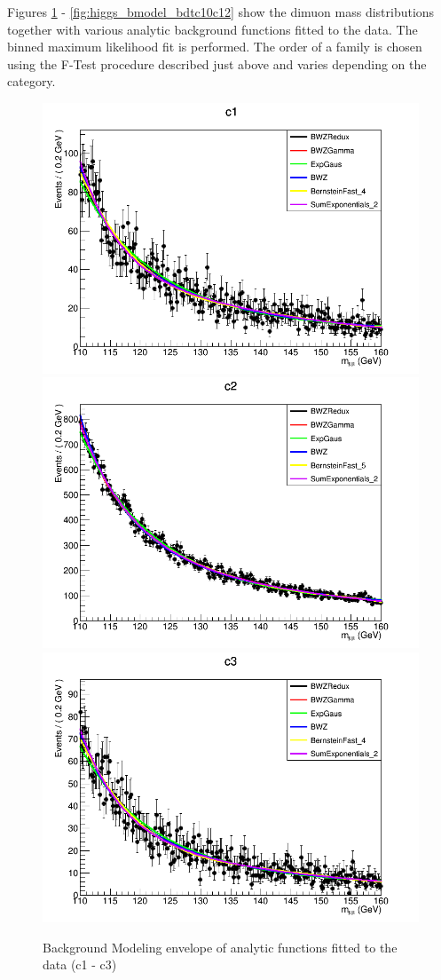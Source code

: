Figures \ref{fig:higgs_bmodel_bdtc1c3} - \ref{fig:higgs_bmodel_bdtc10c12} show the dimuon mass distributions together with various analytic background functions fitted to the data. The binned maximum likelihood fit is performed. The order of a family is chosen using the F-Test procedure described just above and varies depending on the category.
\begin{figure}[htbp]
  \centering
  \includegraphics[width=0.65\linewidth]{figures/ch_higgs/backgroundmodel/uf_bdt/backgroundFits__c1__bkgModels.png}\\
  \includegraphics[width=0.65\linewidth]{figures/ch_higgs/backgroundmodel/uf_bdt/backgroundFits__c2__bkgModels.png}\\
  \includegraphics[width=0.65\linewidth]{figures/ch_higgs/backgroundmodel/uf_bdt/backgroundFits__c3__bkgModels.png}
  \caption{Background Modeling envelope of analytic functions fitted to the data (c1 - c3)}
  \label{fig:higgs_bmodel_bdtc1c3}
\end{figure}

